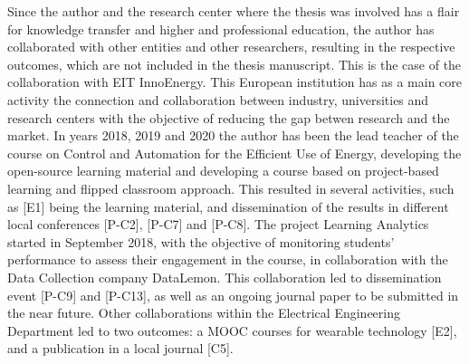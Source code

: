 Since the author and the research center where the thesis was involved has a flair for knowledge transfer and higher and professional education, the author has collaborated with other entities and other researchers, resulting in the respective outcomes, which are not included in the thesis manuscript. This is the case of the collaboration with EIT InnoEnergy. This European institution has as a main core activity the connection and collaboration between industry, universities and research centers with the objective of reducing the gap betwen research and the market. In years 2018, 2019 and 2020 the author has been the lead teacher of the course on Control and Automation for the Efficient Use of Energy, developing the open-source learning material and developing a course based on project-based learning and flipped classroom approach. This resulted in several activities, such as [E1] being the learning material, and dissemination of the results in different local conferences [P-C2], [P-C7] and [P-C8]. The project Learning Analytics started in September 2018, with the objective of monitoring students' performance to assess their engagement in the course, in collaboration with the Data Collection company DataLemon. This collaboration led to dissemination event [P-C9] and [P-C13], as well as an ongoing journal paper to be submitted in the near future. Other collaborations within the Electrical Engineering Department led to two outcomes: a MOOC courses for wearable technology [E2], and a publication in a local journal [C5]. 


\newpage 
